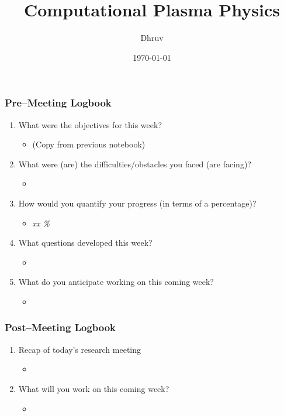 \documentclass[12pt]{article}
\title{Computational Plasma Physics}
\author{Dhruv}
\date{\today}
\begin{document}
\maketitle

\subsubsection*{Pre--Meeting Logbook}
\begin{enumerate}
\item What were the objectives for this week?

  \begin{itemize}
  \item (Copy from previous notebook)
  \end{itemize}

\item What were (are) the difficulties/obstacles you faced (are
  facing)?

  \begin{itemize}
  \item
  \end{itemize}


\item How would you quantify your progress (in terms of a percentage)?

  \begin{itemize}
  \item {\em  xx \%}
  \end{itemize}

\item What questions developed this week?

    \begin{itemize}
    \item
    \end{itemize}

\item What do you anticipate working on this coming week?

  \begin{itemize}
  \item
  \end{itemize}


\end{enumerate}

\subsubsection*{Post--Meeting Logbook}
\begin{enumerate}
\item Recap of today's research meeting

  \begin{itemize}
  \item
  \end{itemize}

\item What will you work on this coming week?

  \begin{itemize}
  \item
  \end{itemize}


\end{enumerate}
\end{document}
